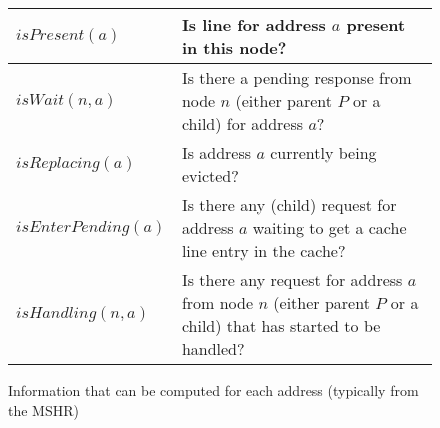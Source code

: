 \begin{figure}\centering
\begin{tabularx}{\linewidth}{|l|X|}
\hline
$isPresent(a)$ & Is line for address $a$ present in this node?\\
\hline
$isWait(n, a)$ & Is there a pending response from node $n$ (either parent $P$
or a child) for address $a$?\\
\hline
$isReplacing(a)$ & Is address $a$ currently being evicted?\\
\hline
$isEnterPending(a)$ & Is there any (child) request for address $a$ waiting to get
a cache line entry in the cache?\\
\hline
$isHandling(n, a)$ & Is there any request for address $a$ from node $n$ (either
parent $P$ or a child) that has started to be handled?\\
\hline
\end{tabularx}
\caption{Information that can be computed for each address (typically from the
MSHR)}
\label{table:functions}
\end{figure}

